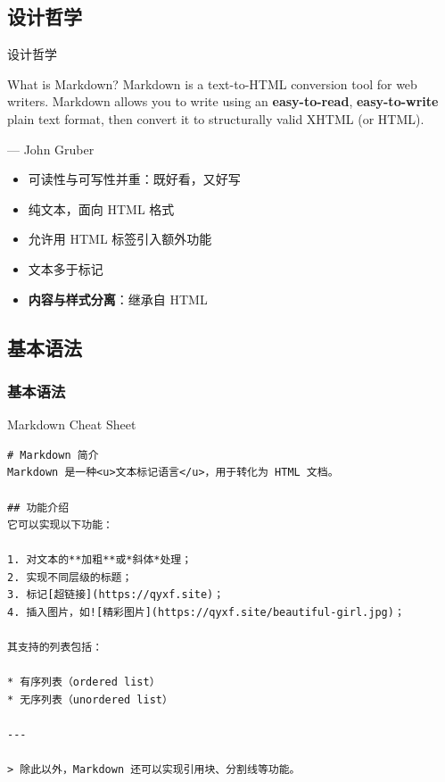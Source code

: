 \documentclass{beamer}
\begin{document}
\subsection{设计哲学}
\begin{frame}{设计哲学}
\begin{block}{What is Markdown?}
Markdown is a text-to-HTML conversion tool for web writers. Markdown allows you
to write using an \textbf{easy-to-read}, \textbf{easy-to-write} plain text format,
then convert it to structurally valid XHTML (or HTML).

\raggedleft --- John Gruber
\end{block}

\begin{itemize}
    \item 可读性与可写性并重：既好看，又好写
    \item 纯文本，面向 HTML 格式
    \item 允许用 HTML 标签引入额外功能
    \item 文本多于标记
    \item \textbf{内容与样式分离}：继承自 HTML
\end{itemize}

\end{frame}

\subsection{基本语法}
\begin{frame}[fragile]
\frametitle{基本语法}\scriptsize
\begin{block}{Markdown Cheat Sheet}
\begin{verbatim}
# Markdown 简介
Markdown 是一种<u>文本标记语言</u>，用于转化为 HTML 文档。

## 功能介绍
它可以实现以下功能：

1. 对文本的**加粗**或*斜体*处理；
2. 实现不同层级的标题；
3. 标记[超链接](https://qyxf.site)；
4. 插入图片，如![精彩图片](https://qyxf.site/beautiful-girl.jpg)；

其支持的列表包括：

* 有序列表（ordered list）
* 无序列表（unordered list）

---

> 除此以外，Markdown 还可以实现引用块、分割线等功能。
\end{verbatim}
\end{block}
\end{frame}
\end{document}
